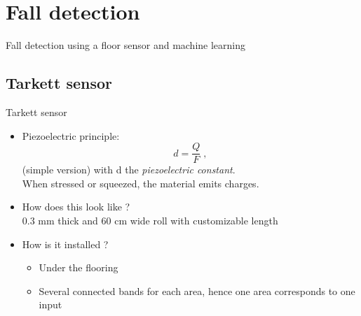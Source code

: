 \section{Fall detection}

\begingroup
{}  %
\begin{frame}[noframenumbering]{}
    \centering
    \vspace{3cm}
    \Huge
    \textcolor{myblue}{Fall detection using a floor sensor and machine learning}
\end{frame}
\endgroup

\subsection{Tarkett sensor}
\begin{frame}{Tarkett sensor}
\begin{minipage}[t]{0.35\linewidth}
    \vspace{0pt}
    \begin{itemize}
        \item Piezoelectric principle: $$d = \frac{Q}{F}\;,$$ (simple version) with d the \emph{piezoelectric constant}.\\
        When stressed or squeezed, the material emits charges.\\
        \pause
        \item How does this look like ?\\
            0.3 mm thick and 60 cm wide roll with customizable length
        \pause
        \item How is it installed ?\\
            \begin{itemize}
                \item Under the flooring
                \item Several connected bands for each area, hence one area corresponds to one input
            \end{itemize}


\end{itemize}
\end{minipage}
\end{frame}
